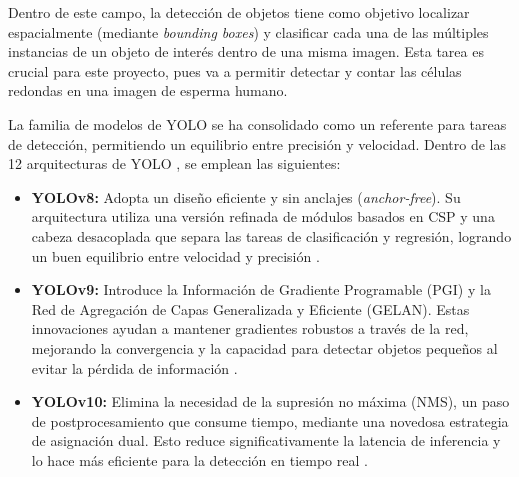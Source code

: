 \documentclass[12pt,a4paper,onecolumn,oneside]{report}
\begin{document}
Dentro de este campo, la detección de objetos tiene como objetivo localizar espacialmente (mediante \textit{bounding boxes}) y clasificar cada una de las múltiples instancias de un objeto de interés dentro de una misma imagen.
Esta tarea es crucial para este proyecto, pues va a permitir detectar y contar las células redondas en una imagen de esperma humano.

La familia de modelos de YOLO \cite{ultralytics_models} se ha consolidado como un referente para tareas de detección, permitiendo un equilibrio entre precisión y velocidad.
Dentro de las 12 arquitecturas de YOLO \cite{ultralytics_models}, se emplean las siguientes:

\begin{itemize}
  \item \textbf{YOLOv8:} Adopta un diseño eficiente y sin anclajes (\textit{anchor-free}). Su arquitectura utiliza una versión refinada de módulos basados en CSP y una cabeza desacoplada que separa las tareas de clasificación y regresión, logrando un buen equilibrio entre velocidad y precisión \cite{defyolos}.
  \item \textbf{YOLOv9:} Introduce la Información de Gradiente Programable (PGI) y la Red de Agregación de Capas Generalizada y Eficiente (GELAN). Estas innovaciones ayudan a mantener gradientes robustos a través de la red, mejorando la convergencia y la capacidad para detectar objetos pequeños al evitar la pérdida de información \cite{defyolos}.
  \item \textbf{YOLOv10:} Elimina la necesidad de la supresión no máxima (NMS), un paso de postprocesamiento que consume tiempo, mediante una novedosa estrategia de asignación dual. Esto reduce significativamente la latencia de inferencia y lo hace más eficiente para la detección en tiempo real \cite{defyolos}.
\end{itemize}
\end{document}
